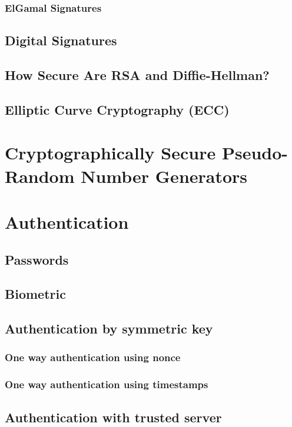 	\subsubsection{ElGamal Signatures}
	
	\newpage
	\subsection{Digital Signatures}
	
	\newpage	
	\subsection{How Secure Are RSA and Diffie-Hellman?}
	
	\newpage	
	\subsection{Elliptic Curve Cryptography (ECC)}
	
	\newpage
	\section{Cryptographically Secure Pseudo-Random Number Generators}
	
	\newpage
	\section{Authentication}
	\subsection{Passwords}
	\subsection{Biometric}
	
	\subsection{Authentication by symmetric key}
	\subsubsection{One way authentication using nonce}
	\subsubsection{One way authentication using timestamps}
	
	\subsection{Authentication with trusted server}
		
